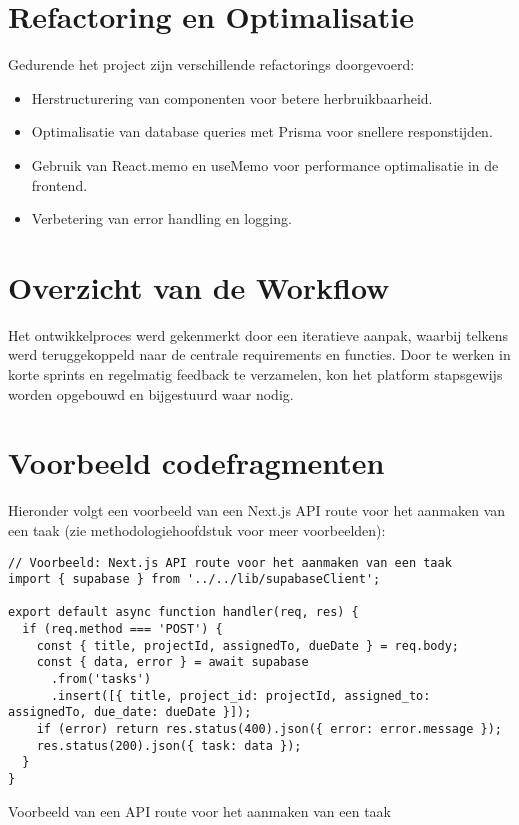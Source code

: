\section{Refactoring en Optimalisatie}
\label{sec:refactoring}

Gedurende het project zijn verschillende refactorings doorgevoerd:
\begin{itemize}
    \item Herstructurering van componenten voor betere herbruikbaarheid.
    \item Optimalisatie van database queries met Prisma voor snellere responstijden.
    \item Gebruik van React.memo en useMemo voor performance optimalisatie in de frontend.
    \item Verbetering van error handling en logging.
\end{itemize}

\section{Overzicht van de Workflow}
\label{sec:workflow}

Het ontwikkelproces werd gekenmerkt door een iteratieve aanpak, waarbij telkens werd teruggekoppeld naar de centrale requirements en functies. Door te werken in korte sprints en regelmatig feedback te verzamelen, kon het platform stapsgewijs worden opgebouwd en bijgestuurd waar nodig.

\section{Voorbeeld codefragmenten}
\label{sec:codefragmenten}

Hieronder volgt een voorbeeld van een Next.js API route voor het aanmaken van een taak (zie methodologiehoofdstuk voor meer voorbeelden):

\begin{listing}[H]
\begin{verbatim}
// Voorbeeld: Next.js API route voor het aanmaken van een taak
import { supabase } from '../../lib/supabaseClient';

export default async function handler(req, res) {
  if (req.method === 'POST') {
    const { title, projectId, assignedTo, dueDate } = req.body;
    const { data, error } = await supabase
      .from('tasks')
      .insert([{ title, project_id: projectId, assigned_to: assignedTo, due_date: dueDate }]);
    if (error) return res.status(400).json({ error: error.message });
    res.status(200).json({ task: data });
  }
}
\end{verbatim}
\caption{Voorbeeld van een API route voor het aanmaken van een taak}
\end{listing}

